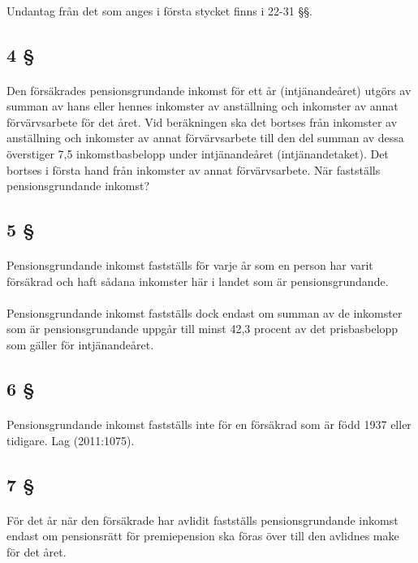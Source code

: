 \documentclass[a4paper,notitlepage,openany,10pt]{book}
\begin{document}
\paragraph*{}
Undantag från det som anges i första stycket finns i 22-31 §§.
\subsection*{4 §}
\paragraph*{}
Den försäkrades pensionsgrundande inkomst för ett år (intjänandeåret) utgörs av summan av hans eller hennes inkomster av anställning och inkomster av annat förvärvsarbete för det året.
Vid beräkningen ska det bortses från inkomster av anställning och inkomster av annat förvärvsarbete till den del summan av dessa överstiger 7,5 inkomstbasbelopp under intjänandeåret (intjänandetaket). Det bortses i första hand från inkomster av annat förvärvsarbete.
När fastställs pensionsgrundande inkomst?
\subsection*{5 §}
\paragraph*{}
Pensionsgrundande inkomst fastställs för varje år som en person har varit försäkrad och haft sådana inkomster här i landet som är pensionsgrundande.
\paragraph*{}
Pensionsgrundande inkomst fastställs dock endast om summan av de inkomster som är pensionsgrundande uppgår till minst 42,3 procent av det prisbasbelopp som gäller för intjänandeåret.
\subsection*{6 §}
\paragraph*{}
Pensionsgrundande inkomst fastställs inte för en försäkrad som är född 1937 eller tidigare.
Lag (2011:1075).
\subsection*{7 §}
\paragraph*{}
För det år när den försäkrade har avlidit fastställs pensionsgrundande inkomst endast om pensionsrätt för premiepension ska föras över till den avlidnes make för det året.
\end{document}
